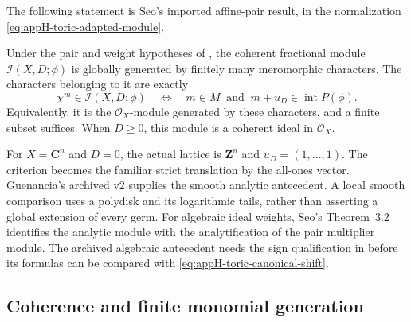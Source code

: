 The following statement is Seo's imported affine-pair result, in the
normalization \eqref{eq:appH-toric-adapted-module}.

\begin{theorem}
\label{thm:appH-toric-analytic-multiplier}
Under the pair and weight hypotheses of
, the coherent fractional module
$\mathcal I(X,D;\phi)$ is globally generated by finitely many
meromorphic characters. The characters belonging to it are exactly
\begin{equation*}
 \chi^m\in\mathcal I(X,D;\phi)
 \quad\Longleftrightarrow\quad
 m\in M\ \text{ and }\ m+u_D\in\operatorname{int}P(\phi).
\tag{H.66}\label{eq:appH-toric-character-criterion}
\end{equation*}
Equivalently, it is the $\mathcal O_X$-module generated by these
characters, and a finite subset suffices. When $D\geq0$, this module
is a coherent ideal in $\mathcal O_X$.
\end{theorem}

For $X=\mathbf C^n$ and $D=0$, the actual lattice is $\mathbf Z^n$
and $u_D=(1,\ldots,1)$. The criterion becomes the familiar strict
translation by the all-ones vector. Guenancia's archived v2
\cite[Theorem~1.13, actual pp.~7--8]{Guenancia11ToricArchivedV2}
supplies the smooth analytic antecedent. A local smooth comparison
uses a polydisk and its logarithmic tails, rather than asserting a
global extension of every germ. For algebraic ideal weights, Seo's
Theorem~3.2 identifies the analytic module with the analytification
of the pair multiplier module. The archived algebraic antecedent
\cite{Blickle03ToricArchivedV1} needs the sign qualification in
 before its formulas
can be compared with \eqref{eq:appH-toric-canonical-shift}.

\subsection{Coherence and finite monomial generation}
\label{sec:appH-toric-coherence-generation}

